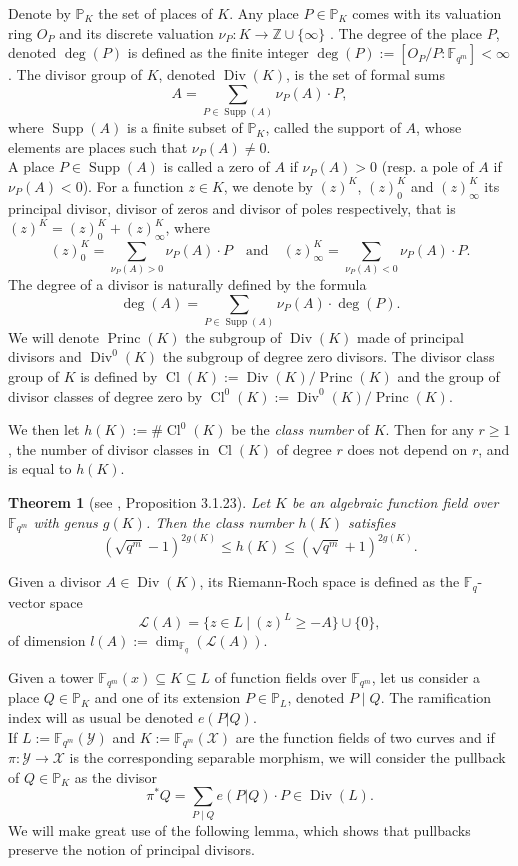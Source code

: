 \documentclass[10pt]{article}
\newtheorem{thm}{Theorem}
\newcommand{\s}{\vspace{0.3cm}}
\newcommand{\cd}{\cdot}
\newcommand{\Z}{\mathbb{Z}}
\newcommand{\PP}{\mathbb{P}}
\newcommand{\fqm}{\mathbb{F}_{q^m}}
\newcommand{\fq}{\mathbb{F}_q}
\newcommand{\su}{\subseteq}
\newcommand{\X}{\mathcal{X}}
\newcommand{\Y}{\mathcal{Y}}
\newcommand{\Div}{\operatorname{Div}}
\newcommand{\Princ}{\operatorname{Princ}}
\newcommand{\Cl}{\operatorname{Cl}}
\newcommand{\Supp}{\operatorname{Supp}}
\begin{document}
Denote by $\PP_K$ the set of places of $K$. Any place $P \in \PP_K$ comes with its valuation ring $O_P$ and its discrete valuation $\nu_P : K \rightarrow \Z \cup \{\infty\}$ . The degree of the place $P$, denoted $\deg(P)$ is defined as the finite integer $\deg(P) :=  [O_P/P:\fqm] < \infty$.
The divisor group of $K$, denoted $\Div(K)$, is the set of formal sums 
\[A = \sum\limits_{P \in \Supp(A)} \nu_P(A) \cd P,\]
where $\Supp(A)$ is a finite subset of $\PP_K$, called the support of $A$, whose elements are places such that $\nu_{P}(A) \neq 0$. \\ A place  $P \in \Supp(A)$ is called a zero of $A$ if $\nu_P(A) >0$ (resp. a pole of $A$ if $\nu_P(A) < 0$). For a function $z \in K$, we denote by $(z)^K$, $(z)^K_0$ and $(z)^K_{\infty}$ its principal divisor, divisor of zeros and divisor of poles respectively, that is $(z)^K = (z)^K_0 + (z)^K_{\infty}$, where 
\[(z)^K_0 = \sum\limits_{\nu_P(A) > 0}\nu_P(A) \cd P \quad \textrm{and}  \quad (z)^K_{\infty} = \sum\limits_{\nu_P(A) < 0}\nu_P(A) \cd P.\]
The degree of a divisor is naturally defined by the formula
\[\deg(A) = \sum\limits_{P \in \Supp(A)} \nu_P(A) \cd \deg( P).\]
\s
We will denote $\Princ(K)$ the subgroup of $\Div(K)$ made of principal divisors and $\Div^0(K)$ the subgroup of degree zero divisors. The divisor class group of $K$ is defined by $\Cl(K):=\Div(K)/\Princ(K)$ and the group of divisor classes of degree zero by $\Cl^0(K):=\Div^0(K)/\Princ(K)$. 

We then let $h(K):= \# \Cl^0(K)$ be the \emph{class number} of $K$. Then for any $r \geq 1$, the number of divisor classes in $\Cl(K)$ of degree $r$ does not depend on $r$, and is equal to $h(K)$.

\s

\begin{thm}[see \cite{Tsf}, Proposition 3.1.23]\label{esti h(X)}
Let $K$ be an algebraic function field over $\fqm$ with genus $g(K)$. Then the class number $h(K)$ satisfies
\[ (\sqrt{q^m}-1)^{2g(K)} \leq h(K) \leq (\sqrt{q^m}+1)^{2g(K)}.\]
\end{thm}
\s

Given a divisor $A \in \Div(K)$, its Riemann-Roch space is defined as the $\fq$-vector space
\[\mathcal{L}(A) = \{z \in L \ | \ (z)^L \geq -A\} \cup \{0\},\]
of dimension $l(A):= \dim_{\fq}(\mathcal{L}(A))$.

\s

Given a tower $\fqm(x) \su K \su L$ of function fields over $\fqm$, let us consider a place  $Q \in \PP_K$ and one of its extension $P \in \PP_L$, denoted $P\mid Q$. The ramification index will as usual be denoted $e(P|Q)$. \\
If $L := \fqm(\Y)$ and $K:=\fqm(\X)$ are the function fields of two curves and if $\pi : \Y \rightarrow \X$ is the corresponding separable morphism, we will consider the pullback of $Q \in \PP_K$ as the divisor
\[\pi^*Q = \sum\limits_{P \mid Q} e(P|Q) \cd P \in \Div(L).\]
We will make great use of the following lemma, which shows that pullbacks preserve the notion of principal divisors.
\end{document}
